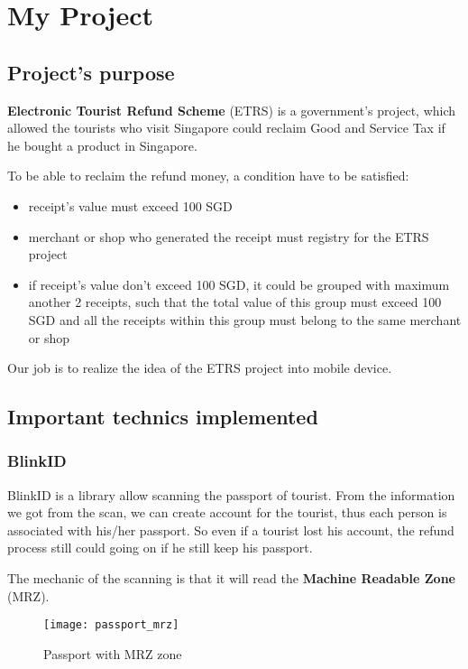 \chapter{My Project}

\section{Project's purpose}\label{condition}

\textbf{Electronic Tourist Refund Scheme} (ETRS) is a government's project, which allowed the tourists who visit Singapore could reclaim Good and Service Tax if he bought a product in Singapore.

To be able to reclaim the refund money, a condition have to be satisfied: 
\begin{itemize}
	\item receipt's value must exceed 100 SGD
	\item merchant or shop who generated the receipt must registry for the ETRS project
	\item if receipt's value don't exceed 100 SGD, it could be grouped with maximum another 2 receipts, such that the total value of this group must exceed 100 SGD and all the receipts within this group must belong to the same merchant or shop
\end{itemize}



Our job is to realize the idea of the ETRS project into mobile device. 

\section{Important technics implemented}

\subsection{BlinkID}
BlinkID is a library allow scanning the passport of tourist. From the information we got from the scan, we can create account for the tourist, thus each person is associated with his/her passport. So even if a tourist lost his account, the refund process still could going on if he still keep his passport.

The mechanic of the scanning is that it will read the \textbf{Machine Readable Zone} (MRZ). 

\begin{figure}[H]
\centering
\texttt{[image: passport\_mrz]}
\caption{Passport with MRZ zone}
\end{figure}

